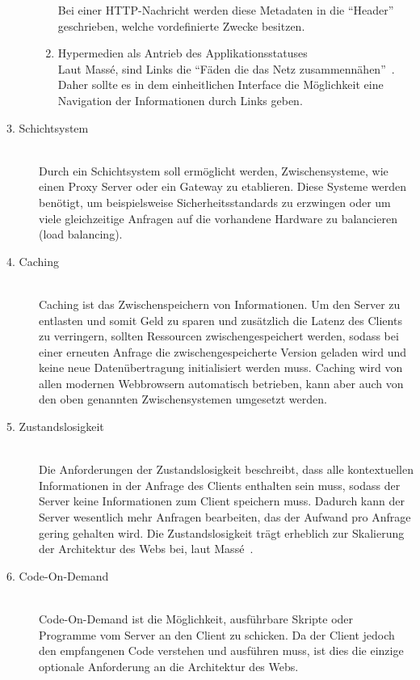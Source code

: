 \begin{description}
\begin{enumerate}
        Bei einer \gls{HTTP}-Nachricht werden diese Metadaten in die ``Header'' 
        geschrieben, welche vordefinierte Zwecke besitzen.

        \item Hypermedien als Antrieb des Applikationsstatuses\hfill \\
        Laut Massé, sind Links die ``Fäden die das Netz zusammennähen''~\cite[][4]{Mas11}.
        Daher sollte es in dem einheitlichen Interface die Möglichkeit eine Navigation
        der Informationen durch Links geben.

    \end{enumerate}

    \item[3. Schichtsystem]\hfill \\
    Durch ein Schichtsystem soll ermöglicht werden, Zwischensysteme, wie einen
    Proxy Server oder ein Gateway zu etablieren. Diese Systeme werden benötigt, 
    um beispielsweise Sicherheitsstandards zu erzwingen oder um viele gleichzeitige
    Anfragen auf die vorhandene Hardware zu balancieren (load balancing).

    \item[4. Caching]\hfill \\
    Caching ist das Zwischenspeichern von Informationen. Um den Server zu entlasten
    und somit Geld zu sparen und zusätzlich die Latenz des Clients zu verringern,
    sollten Ressourcen zwischengespeichert werden, sodass bei einer erneuten 
    Anfrage die zwischengespeicherte Version geladen wird und keine neue 
    Datenübertragung initialisiert werden muss. Caching wird von allen modernen 
    Webbrowsern automatisch betrieben, kann aber auch von den oben genannten
    Zwischensystemen umgesetzt werden.

    \item[5. Zustandslosigkeit]\hfill \\
    Die Anforderungen der Zustandslosigkeit beschreibt, dass alle kontextuellen 
    Informationen in der Anfrage des Clients enthalten sein muss, sodass der 
    Server keine Informationen zum Client speichern muss. Dadurch kann der Server
    wesentlich mehr Anfragen bearbeiten, das der Aufwand pro Anfrage gering 
    gehalten wird. Die Zustandslosigkeit trägt erheblich zur Skalierung der
    Architektur des Webs bei, laut Massé~\cite[][4]{Mas11}. 

    \item[6. Code-On-Demand]\hfill \\
    Code-On-Demand ist die Möglichkeit, ausführbare Skripte oder Programme vom 
    Server an den Client zu schicken. Da der Client jedoch den empfangenen Code
    verstehen und ausführen muss, ist dies die einzige optionale Anforderung an
    die Architektur des Webs.
\end{description}


